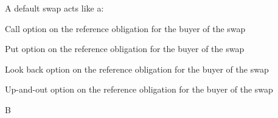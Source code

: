 \documentclass{article}
\newcounter{question} %
\begin{document}
\begin{question}
    A default swap acts like a:
\end{question}

\begin{choices}
    \item Call option on the reference obligation for the buyer of the swap
    \item Put option on the reference obligation for the buyer of the swap
    \item Look back option on the reference obligation for the buyer of the swap
    \item Up-and-out option on the reference obligation for the buyer of the swap
\end{choices}

\begin{correctanswer}
    B
\end{correctanswer}
\end{document}
